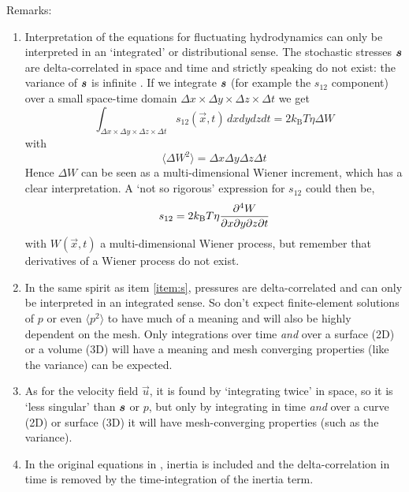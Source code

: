 Remarks:
\begin{enumerate}[1.]
  \item Interpretation of the equations for fluctuating hydrodynamics can only
be interpreted in an `integrated' or distributional sense. The stochastic
stresses $\boldsymbol{s}$ are delta-correlated in space and time and strictly speaking
do not exist: the variance of $\boldsymbol{s}$ is infinite \cite{Gardiner85}. If we
integrate $\boldsymbol{s}$ (for example the $s_{12}$ component)
over a small space-time domain
 $\Delta x\times\Delta y\times\Delta z\times\Delta t$ we get 
\begin{equation}
   \int_{\Delta x\times\Delta y\times\Delta z\times\Delta t} 
s_{12}(\vec x,t)\,dxdydzdt=2k_\text{B}T\eta\Delta W
\end{equation}
with
\begin{equation}
   \langle\Delta W^2\rangle=\Delta x \Delta y\Delta z\Delta t
\end{equation}
Hence $\Delta W$ can be seen as a multi-dimensional Wiener increment, which has
a clear interpretation. A `not so
rigorous' expression for $s_{12}$ could then be,
\begin{equation}
  s_{12} = 2k_\text{B}T\eta\dfrac{\partial ^4 W}{\partial x\partial y\partial z\partial t}
\end{equation}
with $W(\vec x,t)$ a multi-dimensional Wiener process,
but remember that derivatives of a Wiener process do not exist.
\label{item:s}
 
\item In the same spirit as item \ref{item:s}, pressures are delta-correlated
and can only be interpreted in an integrated sense. So don't expect
finite-element solutions of $p$ or even $\langle p^2\rangle$ to have much of 
a meaning and will also be highly dependent on the mesh. Only integrations over
time \emph{and} over a surface (2D) or a volume (3D) will have a meaning and
mesh converging properties (like the variance) can be expected.

\item As for the velocity field $\vec u$, it is found by `integrating twice' in
space, so it is `less singular' than $\boldsymbol{s}$ or $p$, but only by integrating
in time \emph{and}
over a curve (2D) or surface (3D) it will have mesh-converging properties
 (such as the variance). 

\item In the original equations in \cite{Landau59,Sengers06}, inertia is
included and the delta-correlation in time is removed by the time-integration
of the inertia term.

\end{enumerate}
                                                                                
